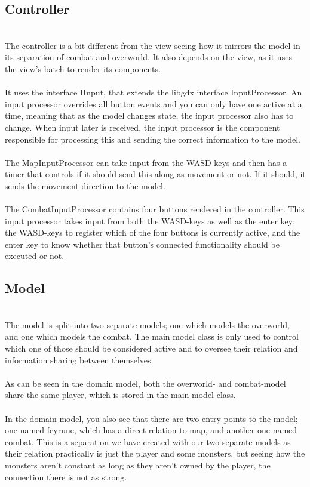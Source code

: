 \subsection{Controller}
\label{controller}
\\
The controller is a bit different from the view seeing how it mirrors the model in its separation of combat and overworld. It also depends on the view, as it uses the view's batch to render its components.\\
\\
It uses the interface IInput, that extends the libgdx interface InputProcessor. An input processor overrides all button events and you can only have one active at a time, meaning that as the model changes state, the input processor also has to change. When input later is received, the input processor is the component responsible for processing this and sending the correct information to the model.\\
\\
The MapInputProcessor can take input from the WASD-keys and then has a timer that controls if it should send this along as movement or not. If it should, it sends the movement direction to the model.\\
\\
The CombatInputProcessor contains four buttons rendered in the controller. This input processor takes input from both the WASD-keys as well as the enter key; the WASD-keys to register which of the four buttons is currently active, and the enter key to know whether that button's connected functionality should be executed or not.

\subsection{Model}
\label{model}
\\
The model is split into two separate models; one which models the overworld, and one which models the combat. The main model class is only used to control which one of those should be considered active and to oversee their relation and information sharing between themselves.\\
\\ %
As can be seen in the domain model, both the overworld- and combat-model share the same player, which is stored in the main model class.\\
\\
In the domain model, you also see that there are two entry points to the model; one named feyrune, which has a direct relation to map, and another one named combat. This is a separation we have created with our two separate models as their relation practically is just the player and some monsters, but seeing how the monsters aren't constant as long as they aren't owned by the player, the connection there is not as strong.

